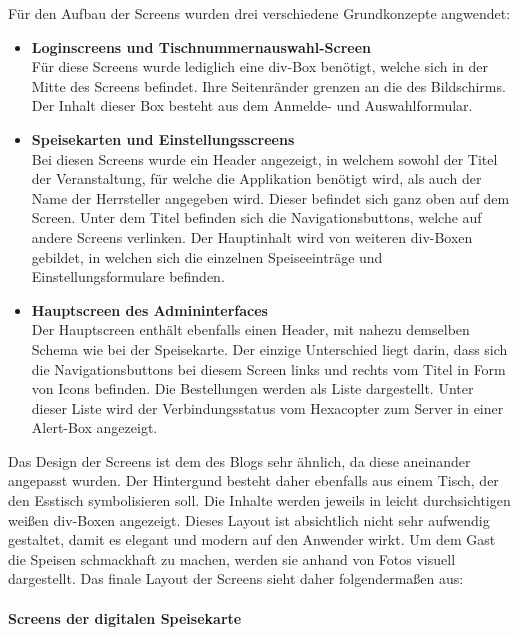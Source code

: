 Für den Aufbau der Screens wurden drei verschiedene Grundkonzepte angwendet:
\begin{itemize}
    \item \textbf{Loginscreens und Tischnummernauswahl-Screen}\\
Für diese Screens wurde lediglich eine div-Box benötigt, welche sich in der Mitte des Screens befindet. Ihre Seitenränder grenzen an die des Bildschirms. Der Inhalt dieser Box besteht aus dem Anmelde- und Auswahlformular.
	\item \textbf{Speisekarten und Einstellungsscreens}\\
Bei diesen Screens wurde ein Header angezeigt, in welchem sowohl der Titel der Veranstaltung, für welche die Applikation benötigt wird, als auch der Name der Herrsteller angegeben wird. Dieser befindet sich ganz oben auf dem Screen. Unter dem Titel befinden sich die Navigationsbuttons, welche auf andere Screens verlinken. Der Hauptinhalt wird von weiteren div-Boxen gebildet, in welchen sich die einzelnen Speiseeinträge und Einstellungsformulare befinden.
    \item \textbf{Hauptscreen des Admininterfaces}\\
Der Hauptscreen enthält ebenfalls einen Header, mit nahezu demselben Schema wie bei der Speisekarte. Der einzige Unterschied liegt darin, dass sich die Navigationsbuttons bei diesem Screen links und rechts vom Titel in Form von Icons befinden. Die Bestellungen werden als Liste dargestellt. Unter dieser Liste wird der Verbindungsstatus vom Hexacopter zum Server in einer Alert-Box angezeigt.
  \end{itemize}
Das Design der Screens ist dem des Blogs sehr ähnlich, da diese aneinander angepasst wurden. Der Hintergund besteht daher ebenfalls aus einem Tisch, der den Esstisch symbolisieren soll. Die Inhalte werden jeweils in leicht durchsichtigen weißen div-Boxen angezeigt. Dieses Layout ist absichtlich nicht sehr aufwendig gestaltet, damit es elegant und modern auf den Anwender wirkt.
Um dem Gast die Speisen schmackhaft zu machen, werden sie anhand von Fotos visuell dargestellt.
Das finale Layout der Screens sieht daher folgendermaßen aus:\\
\\
\textbf{Screens der digitalen Speisekarte}
